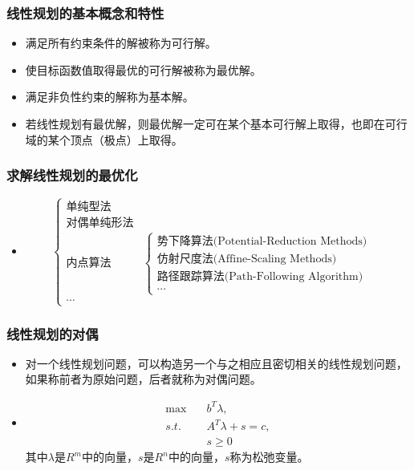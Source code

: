 \documentclass[notheorems,mathserif,table,compress]{beamer}  %
\begin{document}
%
\begin{frame}
\frametitle{线性规划的基本概念和特性}
\begin{itemize}
\item 满足所有约束条件的解被称为可行解。
\item 使目标函数值取得最优的可行解被称为最优解。
\item 满足非负性约束的解称为基本解。
\item 若线性规划有最优解，则最优解一定可在某个基本可行解上取得，也即在可行域的某个顶点（极点）上取得。
\end{itemize}
\end{frame}

%
\begin{frame}
\frametitle{求解线性规划的最优化}
\begin{itemize}
\item 
\begin{displaymath}
\left\{\begin{array}{ll}
\textrm{单纯型法}&\\
\textrm{对偶单纯形法}&\\
\textrm{内点算法}&\left\{\begin{array}{ll}
\textrm{势下降算法(Potential-Reduction Methods)}\\
\textrm{仿射尺度法(Affine-Scaling Methods)}&\\
\textrm{路径跟踪算法(Path-Following Algorithm)}&\\
\cdots\end{array} \right.\\
\cdots
\end{array} \right.
\end{displaymath}
\end{itemize}
\end{frame}

%
\begin{frame}
\frametitle{线性规划的对偶}
\begin{itemize}
\item 对一个线性规划问题，可以构造另一个与之相应且密切相关的线性规划问题，如果称前者为原始问题，后者就称为对偶问题。
\item 
\begin{equation}
\begin{split}
\max \quad &b^{T}\lambda,\\
s.t.  \quad &A^{T}\lambda+s=c,\\
&s\geq0
\end{split}
\end{equation}
其中$\lambda$是$R^m$中的向量，$s$是$R^n$中的向量，$s$称为松弛变量。
\end{itemize}
\end{frame}
\end{document}

